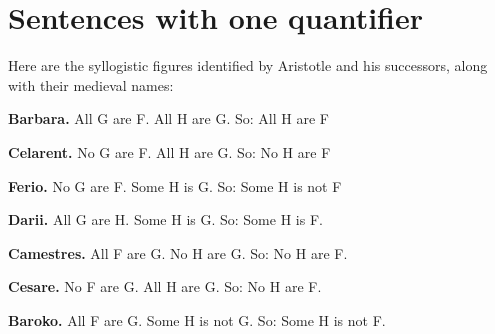 
\setcounter{chapter}{14}
\chapter{Sentences with one quantifier}\label{s:MoreMonadic}\setcounter{ProbPart}{0}
\problempart
\label{pr.BarbaraEtc}
Here are the syllogistic figures identified by Aristotle and his successors, along with their medieval names:
\begin{ebullet}
	\item \textbf{Barbara.} All G are F. All H are G. So:  All H are F
	\item[] 
	\item \textbf{Celarent.} No G are F. All H are G. So: No H are F
	\item[] 
	\item \textbf{Ferio.} No G are F. Some H is G. So: Some H is not F
	\item[] 
	\item \textbf{Darii.} All G are H. Some H is G. So: Some H is F.
	\item[] 
	\item \textbf{Camestres.} All F are G. No H are G. So: No H are F.
	\item[] 
	\item \textbf{Cesare.} No F are G. All H are G. So: No H are F.
	\item[] 
	\item \textbf{Baroko.} All F are G. Some H is not G. So: Some H is not F.
	\item[] 

\end{ebullet}
